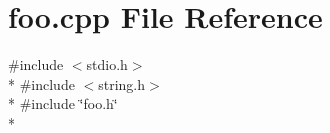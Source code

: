 \section{foo.\+cpp File Reference}
\label{foo_8cpp}
{\ttfamily \#include $<$stdio.\+h$>$}\\*
{\ttfamily \#include $<$string.\+h$>$}\\*
{\ttfamily \#include \char`\"{}foo.\+h\char`\"{}}\\*
